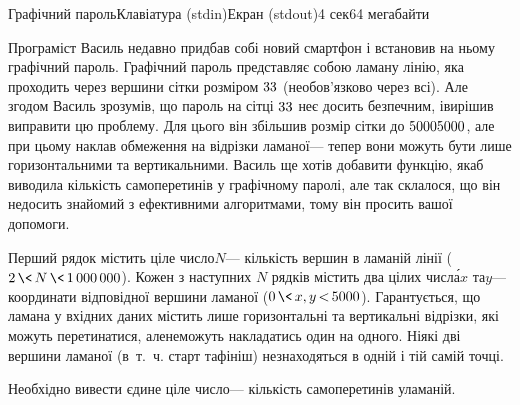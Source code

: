 \begin{problem}{Графічний пароль}{Клавіатура (stdin)}{Екран (stdout)}{4 сек}{64 мегабайти}


Програміст Василь недавно придбав собі новий смартфон і встановив на ньому графічний пароль. Графічний пароль представляє собою ламану лінію, яка проходить через вершини сітки розміром $3{\*}3$ (не\nolinebreak[3] обов'язково через всі). Але згодом Василь зрозумів, що пароль на сітці $3{\*}3$ не\nolinebreak[3] є досить безпечним, і\nolinebreak[3] вирішив виправити цю проблему. Для цього він збільшив розмір сітки до $5000{\*}5000$, але при цьому наклав обмеження на відрізки ламаної\nolinebreak[3] --- тепер вони можуть бути лише горизонтальними та вертикальними. Василь ще хотів добавити функцію, яка\nolinebreak[3] б виводила кількість самоперетинів у графічному паролі, але так склалося, що він не\nolinebreak[3] досить знайомий з ефективними алгоритмами, тому він просить вашої допомоги.

\InputFile
Перший рядок містить ціле число\nolinebreak[3] $N$\nolinebreak[3] --- кількість вершин в ламаній лінії ($2\dib{{\<}}N\dib{{\<}}{1\,000\,000}$). Кожен з наступних $N$ рядків містить два цілих числ\'{а}\nolinebreak[1] $x$ та\nolinebreak[3] $y$\nolinebreak[3] --- координати відповідної вершини ламаної ($0\dib{{\<}}{x, y}\dib{{<}}5000$). Гарантується, що ламана у вхідних даних містить лише горизонтальні та вертикальні відрізки, які можуть перетинатися, але\nolinebreak[1] не\nolinebreak[3] можуть накладатись один на одного. Ніякі дві вершини ламаної (в~т.~ч. старт та\nolinebreak[2] фініш) не\nolinebreak[3] знаходяться в одній і тій самій точці.

\OutputFile
Необхідно вивести єдине ціле число\nolinebreak[3] --- кількість самоперетинів у\nolinebreak[3] ламаній.

\Examples
\begin{exampleSimple}{5em}{3em}%
%
%
\end{exampleSimple}

\end{problem}

